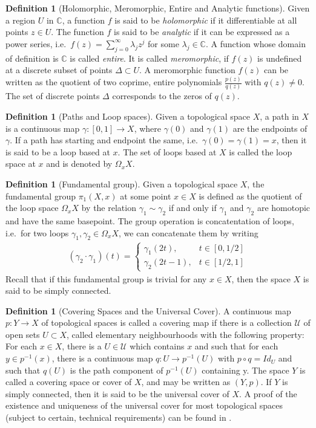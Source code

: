 \documentclass[11pt]{report}
\theoremstyle{definition}
\newtheorem{defn}[thm]{Definition}
\begin{document}
\begin{defn}[Holomorphic, Meromorphic, Entire and Analytic functions]
  Given a region $U$ in $\mathbb{C}$, a function $f$ is said to be \emph{holomorphic} if it differentiable at all points $z \in U$. The function $f$ is said to be \emph{analytic} if it can be expressed as a power series, i.e.\ $f(z) = \sum\limits^{\infty}_{j=0}\lambda_jz^j$ for some $\lambda_j \in \mathbb{C}$. A function whose domain of definition is $\mathbb{C}$ is called \emph{entire}. It is called \emph{meromorphic}, if $f(z)$ is undefined at a discrete subset of points $\Delta \subset U$. A meromorphic function $f(z)$ can be written as the quotient of two coprime, entire polynomials $\frac{p(z)}{q(z)}$ with $q(z) \neq 0$. The set of discrete points $\Delta$ corresponds to the zeros of $q(z)$.
\end{defn}
\begin{defn}[Paths and Loop spaces]
  Given a topological space $X$, a path in $X$ is a continuous map $\gamma \colon [0,1] \rightarrow X$, where $\gamma(0)$ and $\gamma(1)$ are the endpoints of $\gamma$. If a path has starting and endpoint the same, i.e.\ $\gamma(0)=\gamma(1) = x$, then it is said to be a loop based at $x$. The set of loops based at $X$ is called the loop space at $x$ and is denoted by $\Omega_xX$.
\end{defn}
\begin{defn}[Fundamental group]
  Given a topological space $X$, the fundamental group $\pi_1(X,x)$ at some point $x \in X$ is defined as the quotient of the loop space $\Omega_xX$ by the relation $\gamma_1 \sim\gamma_2$ if and only if $\gamma_1$ and $\gamma_2$ are homotopic and have the same basepoint. The group operation is concatentation of loops, i.e.\ for two loops $\gamma_1,\gamma_2 \in \Omega_xX$, we can concatenate them by writing 
  \begin{align*}
    (\gamma_2\cdot\gamma_1)(t) = \begin{cases}
      \gamma_1(2t), &t \in [0,1/2] \\
      \gamma_2(2t-1), &t \in [1/2,1]
    \end{cases}
  \end{align*}
  Recall that if this fundamental group is trivial for any $x \in X$, then the space $X$ is said to be simply connected.
\end{defn}
\begin{defn}[Covering Spaces and the Universal Cover]
  A continuous map $p\colon Y \rightarrow X$ of topological spaces is called a covering map if there is a collection $\mathcal{U}$ of open sets $U \subset X$, called elementary neighbourhoods with the following property: For each $x \in X$, there is a $U\in \mathcal{U}$ which contains $x$ and such that for each $y \in p^{-1}(x)$, there is a continuous map $q:U \rightarrow p^{-1}(U)$ with $p\circ q = Id_U$ and such that $q(U)$ is the path component of $p^{-1}(U)$ containing y. The space $Y$ is called a covering space or cover of $X$, and may be written as $(Y,p)$. If $Y$ is simply connected, then it is said to be the universal cover of $X$.  A proof of the existence and uniqueness of the universal cover for most topological spaces (subject to certain, technical requirements) can be found in \cite[p.63]{Hatchers}.
\end{defn}
\end{document}
